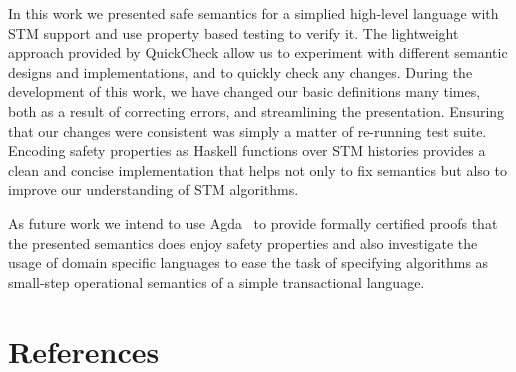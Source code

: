 \documentclass[3p,times,procedia]{elsarticle}
\theoremstyle{definition}
\begin{document}
In this work we presented safe semantics for a simplied high-level language with STM support and use
property based testing to verify it. The lightweight approach provided by QuickCheck allow us to experiment
with different semantic designs and implementations, and to quickly check any changes. During the development of this work,
we have changed our basic definitions many times, both as a result of correcting errors, and streamlining the presentation.
Ensuring that our changes were consistent was simply a matter of re-running test suite. Encoding safety properties as
Haskell functions over STM histories provides a clean and concise implementation that helps not only to fix semantics
but also to improve our understanding of STM algorithms.

As future work we intend to use Agda~\cite{Norell2009} to provide formally certified proofs that the presented semantics does
enjoy safety properties and also investigate the usage of domain specific languages to ease the task of specifying algorithms
as small-step operational semantics of a simple transactional language.

\section{References}


 
\end{document}
